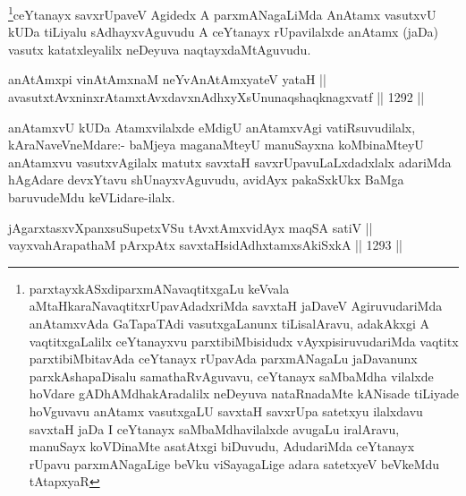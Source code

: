 \begin{artha}
\footnote{parxtayxkASxdiparxmANavaqtitxgaLu keVvala aMtaHkaraNavaqtitxrUpavAdadxriMda savxtaH jaDaveV AgiruvudariMda anAtamxvAda GaTapaTAdi vasutxgaLanunx tiLisalAravu, adakAkxgi A vaqtitxgaLalilx ceYtanayxvu parxtibiMbisidudx vAyxpisiruvudariMda vaqtitx parxtibiMbitavAda ceYtanayx rUpavAda parxmANagaLu jaDavanunx parxkAshapaDisalu samathaRvAguvavu, ceYtanayx saMbaMdha vilalxde hoVdare gADhAMdhakAradalilx neDeyuva nataRnadaMte kANisade tiLiyade hoVguvavu anAtamx vasutxgaLU savxtaH savxrUpa satetxyu ilalxdavu savxtaH jaDa I ceYtanayx saMbaMdhavilalxde avugaLu iralAravu, manuSayx koVDinaMte asatAtxgi biDuvudu, AdudariMda ceYtanayx rUpavu parxmANagaLige beVku viSayagaLige adara satetxyeV beVkeMdu tAtapxyaR}ceYtanayx savxrUpaveV Agidedx A parxmANagaLiMda AnAtamx vasutxvU kUDa tiLiyalu sAdhayxvAguvudu A ceYtanayx rUpavilalxde anAtamx (jaDa) vasutx katatxleyalilx neDeyuva naqtayxdaMtAguvudu.
\end{artha}


\begin{shl}
anAtAmx\s pi vinA\s \s tAmxnaM neYvAnAtAmxyateV yataH || \\
avasutxtAvxninxrAtamxtAvxdavxnAdhxyXsUnunaqshaqknagxvatf \hfill || 1292 ||  
\end{shl}

\begin{artha}
anAtamxvU kUDa Atamxvilalxde eMdigU anAtamxvAgi vatiRsuvudilalx, kAraNaveVneMdare:- baMjeya maganaMteyU manuSayxna koMbinaMteyU anAtamxvu vasutxvAgilalx matutx savxtaH savxrUpavuLaLxdadxlalx adariMda hAgAdare devxYtavu shUnayxvAguvudu, avidAyx pakaSxkUkx BaMga baruvudeMdu keVLidare-ilalx.
\end{artha}


\begin{shl}
\footnotemark[2]jAgarxtasxvXpanxsuSupetxVSu tAvxtAmxvidAyx maqSA satiV || \\
vayxvahArapathaM pArxpAtx savxtaHsidAdhxtamxsAkiSxkA \hfill || 1293 ||  
\end{shl}

